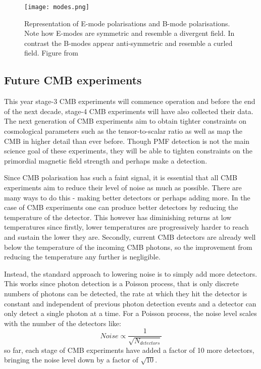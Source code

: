 \begin{figure}[h]
\centering
\texttt{[image: modes.png]}
\caption{Representation of E-mode polarisations and B-mode polarisations. Note how E-modes are symmetric and resemble a divergent field. In contrast the B-modes appear anti-symmetric and resemble a curled field. Figure from \cite{39087c288ce54d4bb9580169e1666880}}
\label{fig:modes}
\end{figure}

\subsection{Future CMB experiments}
This year stage-3 CMB experiments will commence operation and before the end of the next decade, stage-4 CMB experiments will have also collected their data. The next generation of CMB experiments aim to obtain tighter constraints on cosmological parameters such as the tensor-to-scalar ratio as well as map the CMB in higher detail than ever before. Though PMF detection is not the main science goal of these experiments, they will be able to tighten constraints on the primordial magnetic field strength and perhaps make a detection.

Since CMB polarisation has such a faint signal, it is essential that all CMB experiments aim to reduce their level of noise as much as possible. There are many ways to do this - making better detectors or perhaps adding more. In the case of CMB experiments one can produce better detectors by reducing the temperature of the detector. This however has diminishing returns at low temperatures since firstly, lower temperatures are progressively harder to reach and sustain the lower they are. Secondly, current CMB detectors are already well below the temperature of the incoming CMB photons, so the improvement from reducing the temperature any further is negligible.

Instead, the standard approach to lowering noise is to simply add more detectors. This works since photon detection is a Poisson process, that is only discrete numbers of photons can be detected, the rate at which they hit the detector is constant and independent of previous photon detection events and a detector can only detect a single photon at a time. For a Poisson process, the noise level scales with the number of the detectors like: 
\begin{equation}
\label{eqn:noisescaling}
Noise \propto \frac{1}{\sqrt{N_{detectors}}}
\end{equation}
so far, each stage of CMB experiments have added a factor of 10 more detectors, bringing the noise level down by a factor of $\sqrt{10}$.


